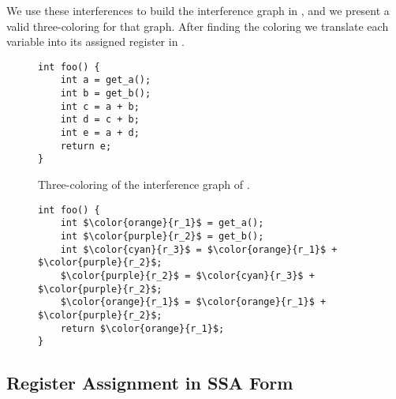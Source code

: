 We use these interferences to build the interference graph in , and we present a valid three-coloring for that graph. After finding the coloring we translate each variable into its assigned register in .

\begin{figure}[ht]
\centering
\begin{minipage}{0.48\textwidth}
\lstset{style=C}
\begin{lstlisting}[caption={C program returning $2a + 3b$.}, label={fig:ig1}]
int foo() {
    int a = get_a();
    int b = get_b();
    int c = a + b;
    int d = c + b;
    int e = a + d;
    return e;
}
\end{lstlisting}
\end{minipage}
\hfill
\begin{minipage}{0.48\textwidth}
  \centering
  \caption{Three-coloring of the interference graph of .}
  \label{fig:ig2}
\end{minipage}
\end{figure}

\begin{figure}
\label{fig:ig3}
\lstset{style=C}
\begin{lstlisting}[caption={Program shown in \Cref{fig:ig1} after \gls{ra}.}, label={fig:ig3}]
int foo() {
    int $\color{orange}{r_1}$ = get_a();
    int $\color{purple}{r_2}$ = get_b();
    int $\color{cyan}{r_3}$ = $\color{orange}{r_1}$ + $\color{purple}{r_2}$;
    $\color{purple}{r_2}$ = $\color{cyan}{r_3}$ + $\color{purple}{r_2}$;
    $\color{orange}{r_1}$ = $\color{orange}{r_1}$ + $\color{purple}{r_2}$;
    return $\color{orange}{r_1}$;
}
\end{lstlisting}
\end{figure}

\subsection{Register Assignment in SSA Form}
\label{subsec:ssara}

